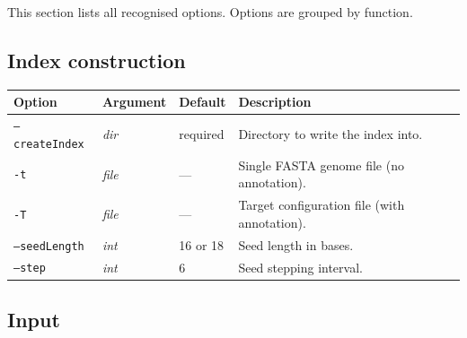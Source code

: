 \documentclass[11pt]{article}
\newcommand{\code}[1]{\texttt{#1}}
\begin{document}
This section lists all recognised options.  Options are grouped by
function.

\subsection{Index construction}

\begin{center}
\begin{longtable}{p{4cm} p{2.2cm} p{2cm} p{6cm}}
\toprule
\textbf{Option} & \textbf{Argument} & \textbf{Default} & \textbf{Description} \\
\midrule
\endhead
\code{--createIndex} & \textit{dir}  & required & Directory to write the index into. \\
\code{-t}            & \textit{file} & ---       & Single FASTA genome file (no annotation). \\
\code{-T}            & \textit{file} & ---       & Target configuration file (with annotation). \\
\code{--seedLength}  & \textit{int}  & 16 or 18  & Seed length in bases. \\
\code{--step}        & \textit{int}  & 6         & Seed stepping interval. \\
\bottomrule
\end{longtable}
\end{center}

\subsection{Input}
\end{document}

